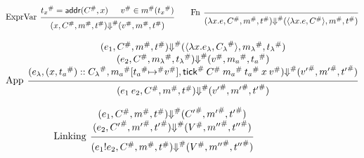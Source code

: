 \documentclass[acmsmall,screen,review]{acmart}
\theoremstyle{definition}
\newcommand*{\cons}{::}
\newcommand*{\A}[1]{{#1}^{\#}}
\newcommand*{\mem}{m}
\newcommand*{\link}[2]{{#1}\mathtt{!}{#2}}
\newcommand*{\addr}{\mathsf{addr}}
\newcommand*{\tick}{\mathsf{tick}}
\begin{document}
\begin{figure}[htb]
  \begin{flushright}\fbox{$(e,\A{C},\A\mem,\A{t})\A\Downarrow(\A{V},\A{\mem'},\A{t'})$}\end{flushright}
  \footnotesize
  \[
    \begin{prooftree}
      \hypo{\A{t_{x}}=\addr(\A{C},x)}
      \hypo{\A{v}\in\A{\mem}(\A{t_{x}})}
      \infer[left label=ExprVar]2{
      (x, \A{C}, \A{\mem}, \A{t})
      \A{\Downarrow}
      (\A{v}, \A{\mem}, \A{t})
      }
    \end{prooftree}\qquad
    \begin{prooftree}
      \infer[left label=Fn]0{
      (\lambda x.e, \A{C}, \A{\mem}, \A{t})
      \A{\Downarrow}
      (\langle\lambda x.e, \A{C}\rangle, \A{\mem}, \A{t})
      }
    \end{prooftree}
  \]

  \[
    \begin{prooftree}
      \hypo{
        \begin{matrix}
          (e_{1}, \A{C}, \A{\mem}, \A{t})
          \A{\Downarrow}
          (\langle\lambda x.e_{\lambda}, \A{C_{\lambda}}\rangle, \A{\mem_{\lambda}}, \A{t_{\lambda}}) \\
          (e_{2}, \A{C}, \A{\mem_{\lambda}}, \A{t_{\lambda}})
          \A{\Downarrow}
          (\A{v}, \A{\mem_{a}}, \A{t_{a}})                                                            \\
          (e_{\lambda}, (x, \A{t_a})\cons \A{C_{\lambda}}, \A{\mem_{a}}[\A{t_{a}}\A{\mapsto} \A{v}], \A{\tick}\:\A{C}\:\A{\mem_a}\:\A{t_{a}}\:x\:\A{v})
          \A{\Downarrow}
          (\A{v'}, \A{\mem'},\A{t'})
        \end{matrix}
      }
      \infer[left label={App}]1{
      (e_{1}\:e_{2}, \A{C}, \A{\mem}, \A{t})
      \A{\Downarrow}
      (\A{v'}, \A{\mem'},\A{t'})
      }
    \end{prooftree}
  \]

  \[
    \begin{prooftree}
      \hypo{
        \begin{matrix}
          (e_{1}, \A{C}, \A{\mem}, \A{t})
          \A{\Downarrow}
          (\A{C'}, \A{\mem'}, \A{t'}) \\
          (e_{2}, \A{C'}, \A{\mem'}, \A{t'})
          \A{\Downarrow}
          (\A{V}, \A{\mem''}, \A{t''})
        \end{matrix}
      }
      \infer[left label=Linking]1{
      (\link{e_{1}}{e_{2}}, \A{C}, \A{\mem}, \A{t})
      \A\Downarrow
      (\A{V}, \A{\mem''}, \A{t''})
      }
    \end{prooftree}
  \]


\end{figure}
\end{document}
